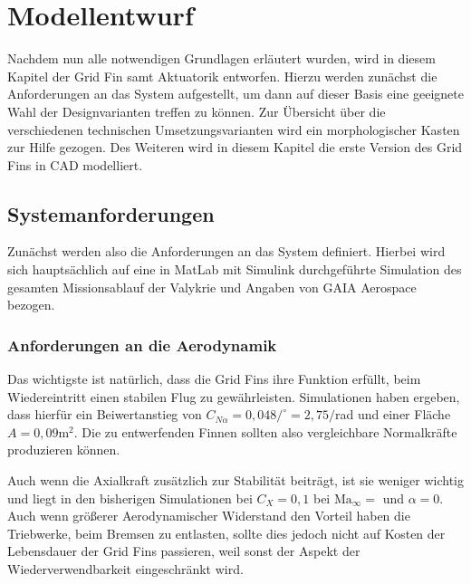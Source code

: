 \chapter{Modellentwurf}\label{sec:modellentwurf}
Nachdem nun alle notwendigen Grundlagen erläutert wurden, wird in diesem Kapitel der Grid Fin samt Aktuatorik entworfen. Hierzu werden zunächst die Anforderungen an das System aufgestellt, um dann auf dieser Basis eine geeignete Wahl der Designvarianten treffen zu können. Zur Übersicht über die verschiedenen technischen Umsetzungsvarianten wird ein morphologischer Kasten zur Hilfe gezogen. Des Weiteren wird in diesem Kapitel die erste Version des Grid Fins in CAD modelliert.
\section{Systemanforderungen}
Zunächst werden also die Anforderungen an das System definiert. Hierbei wird sich hauptsächlich auf eine in MatLab mit Simulink durchgeführte Simulation des gesamten Missionsablauf der Valykrie und Angaben von GAIA Aerospace bezogen.
\subsection{Anforderungen an die Aerodynamik}
Das wichtigste ist natürlich, dass die Grid Fins ihre Funktion erfüllt, beim Wiedereintritt einen stabilen Flug zu gewährleisten. Simulationen haben ergeben, dass hierfür ein Beiwertanstieg von $C_{N\alpha} =0,048/^\circ=2,75/$rad und einer Fläche $A=0,09\mathrm{m}^2$. Die zu entwerfenden Finnen sollten also vergleichbare Normalkräfte produzieren können.

Auch wenn die Axialkraft zusätzlich zur Stabilität beiträgt, ist sie weniger wichtig und liegt in den bisherigen Simulationen bei $C_X=0,1$ bei $\mathrm{Ma}_\infty=$ und $\alpha=0$. Auch wenn größerer Aerodynamischer Widerstand den Vorteil haben die Triebwerke, beim Bremsen zu entlasten, sollte dies jedoch nicht auf Kosten der Lebensdauer der Grid Fins passieren, weil sonst der Aspekt der Wiederverwendbarkeit eingeschränkt wird.
